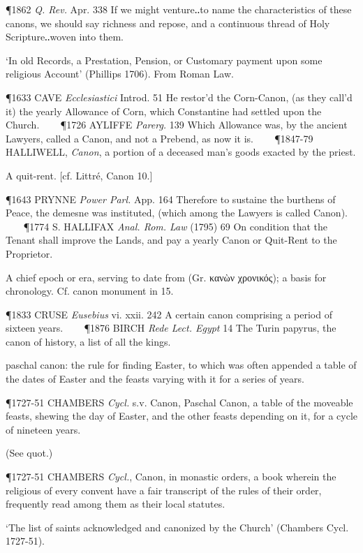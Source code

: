 \begin{description}[wide, labelwidth=!, labelindent=0pt]
\begin{myenumerate}
\P 1862  \textit{Q. Rev.} Apr. 338 If we might venture‥to name the characteristics of these canons, we should say richness and repose, and a continuous thread of Holy Scripture‥woven into them.

 ‘In old Records, a Prestation, Pension, or Customary payment upon some religious Account’ (Phillips 1706). From Roman Law.

\P 1633 CAVE  \textit{Ecclesiastici} Introd. 51 He restor'd the Corn-Canon, (as they call'd it) the yearly Allowance of Corn, which Constantine had settled upon the Church.    
\P 1726 AYLIFFE  \textit{Parerg.} 139 Which Allowance was, by the ancient Lawyers, called a Canon, and not a Prebend, as now it is.    
\P 1847-79 HALLIWELL,  \textit{Canon}, a portion of a deceased man's goods exacted by the priest.

 A quit-rent. [cf. Littré, Canon 10.]

\P 1643 PRYNNE  \textit{Power Parl.} App. 164 Therefore to sustaine the burthens of Peace, the demesne was instituted, (which among the Lawyers is called Canon).    
\P 1774 S. HALLIFAX  \textit{Anal. Rom. Law} (1795) 69 On condition that the Tenant shall improve the Lands, and pay a yearly Canon or Quit-Rent to the Proprietor.

 A chief epoch or era, serving to date from (Gr. κανὼν χρονικός); a basis for chronology. Cf. canon monument in 15.

\P 1833 CRUSE  \textit{Eusebius} vi. xxii. 242 A certain canon comprising a period of sixteen years.    
\P 1876 BIRCH  \textit{Rede Lect. Egypt} 14 The Turin papyrus, the canon of history, a list of all the kings.

 paschal canon: the rule for finding Easter, to which was often appended a table of the dates of Easter and the feasts varying with it for a series of years.

\P 1727-51 CHAMBERS  \textit{Cycl.} s.v. Canon, Paschal Canon, a table of the moveable feasts, shewing the day of Easter, and the other feasts depending on it, for a cycle of nineteen years.

 (See quot.)

\P 1727-51 CHAMBERS  \textit{Cycl.}, Canon, in monastic orders, a book wherein the religious of every convent have a fair transcript of the rules of their order, frequently read among them as their local statutes.

 ‘The list of saints acknowledged and canonized by the Church’ (Chambers Cycl. 1727-51).


\end{myenumerate}
\end{description}

